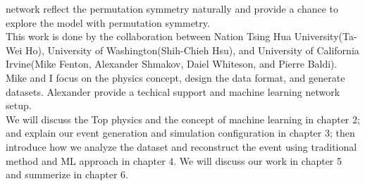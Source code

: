 network reflect the permutation symmetry naturally and provide a chance to explore the model with permutation symmetry. 
\\
This work is done by the collaboration between Nation Tsing Hua University(Ta-Wei Ho), University of Washington(Shih-Chieh Hsu), and University of California Irvine(Mike Fenton, Alexander Shmakov, Daiel Whiteson, and Pierre Baldi). Mike and I focus on the physics concept, design the data format, and generate datasets. Alexander provide a techical support and machine learning network setup. 
\\
We will discuss the Top physics and the concept of machine learning in chapter 2; and explain our event generation and simulation configuration in chapter 3; then introduce how we analyze the dataset and reconstruct the event using traditional method and ML approach in chapter 4. We will discuss our work in chapter 5 and summerize in chapter 6.


